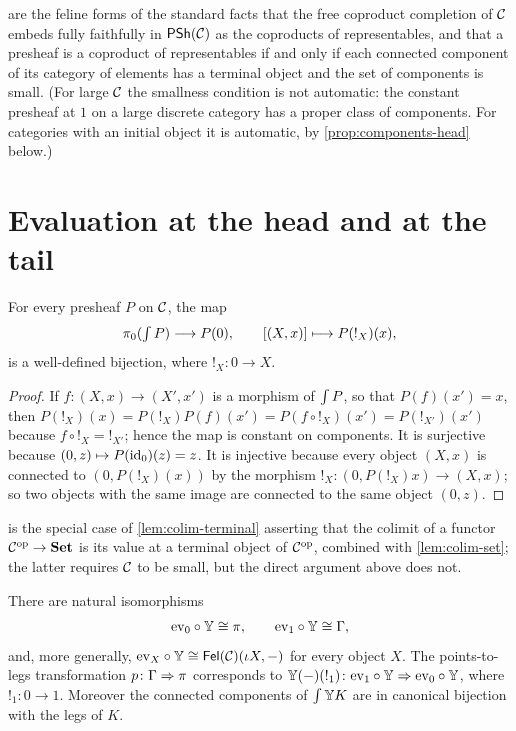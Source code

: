 \begin{remark}\label{rem:yoneda-honest}
 are the feline forms of the standard facts
that the free coproduct completion of $\mathcal{C}$ embeds fully faithfully in
$\mathsf{PSh}(\mathcal{C})$ as the coproducts of representables, and that a presheaf is a
coproduct of representables if and only if each connected component of its
category of elements has a terminal object and the set of components is small.
(For large $\mathcal{C}$ the smallness condition is not automatic: the constant
presheaf at $1$ on a large discrete category has a proper class of components.
For categories with an initial object it is automatic, by
\cref{prop:components-head} below.)
\end{remark}

\section{Evaluation at the head and at the tail}\label{sec:head-tail-eval}

\begin{proposition}\label{prop:components-head}
For every presheaf $P$ on $\mathcal{C}$, the map
\[
\pi_0(\textstyle\int P)\longrightarrow P(0),\qquad[(X,x)]\longmapsto P({!_X})(x),
\]
is a well-defined bijection, where ${!_X}\colon0\to X$.
\end{proposition}

\begin{proof}
If $f\colon(X,x)\to(X',x')$ is a morphism of $\textstyle\int P$, so that $P(f)(x')=x$,
then $P({!_X})(x)=P({!_X})P(f)(x')=P(f\circ{!_X})(x')=P({!_{X'}})(x')$ because
$f\circ{!_X}={!_{X'}}$; hence the map is constant on components. It is
surjective because $(0,z)\mapsto P(\mathrm{id}_0)(z)=z$. It is injective because every
object $(X,x)$ is connected to $(0,P({!_X})(x))$ by the morphism
${!_X}\colon(0,P({!_X})x)\to(X,x)$; so two objects with the same image are
connected to the same object $(0,z)$.
\end{proof}

\begin{remark}\label{rem:components-honest}
 is the special case of \cref{lem:colim-terminal}
asserting that the colimit of a functor $\mathcal{C}^{\mathrm{op}}\to\mathbf{Set}$ is its value at a
terminal object of $\mathcal{C}^{\mathrm{op}}$, combined with \cref{lem:colim-set}; the latter
requires $\mathcal{C}$ to be small, but the direct argument above does not.
\end{remark}

\begin{theorem}\label{thm:head-tail-eval}
There are natural isomorphisms
\[
\mathrm{ev}_0\circ\mathbb{Y}\cong\pi,\qquad\mathrm{ev}_1\circ\mathbb{Y}\cong\Gamma,
\]
and, more generally, $\mathrm{ev}_X\circ\mathbb{Y}\cong\mathsf{Fel}(\mathcal{C})(\iota X,-)$ for every object
$X$. The points-to-legs transformation $p\colon\Gamma\Rightarrow\pi$
corresponds to $\mathbb{Y}(-)({!_1})\colon\mathrm{ev}_1\circ\mathbb{Y}\Rightarrow\mathrm{ev}_0\circ\mathbb{Y}$,
where ${!_1}\colon0\to1$. Moreover the connected components of $\textstyle\int\mathbb{Y} K$ are
in canonical bijection with the legs of $K$.
\end{theorem}

